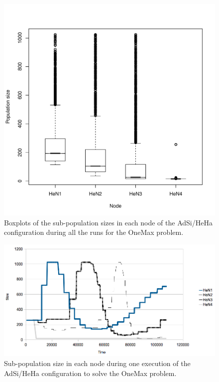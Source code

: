 \begin{figure}
\centering
\includegraphics[scale =0.4] {gfx/adaptiveresults/sizesONEMAX.pdf}
\caption{Boxplots of the sub-population sizes in each node of the AdSi/HeHa configuration during all
  the runs for the OneMax problem.}
\label{fig:sizesONEMAX}
\end{figure}

\begin{figure}
\centering
\includegraphics[scale =0.4] {gfx/adaptiveresults/sizesONEMAX1ejec.png}
\caption{Sub-population size in each node during one execution of the AdSi/HeHa configuration to solve the OneMax problem.}
\label{fig:sizesONEMAX1ejec}
\end{figure}


